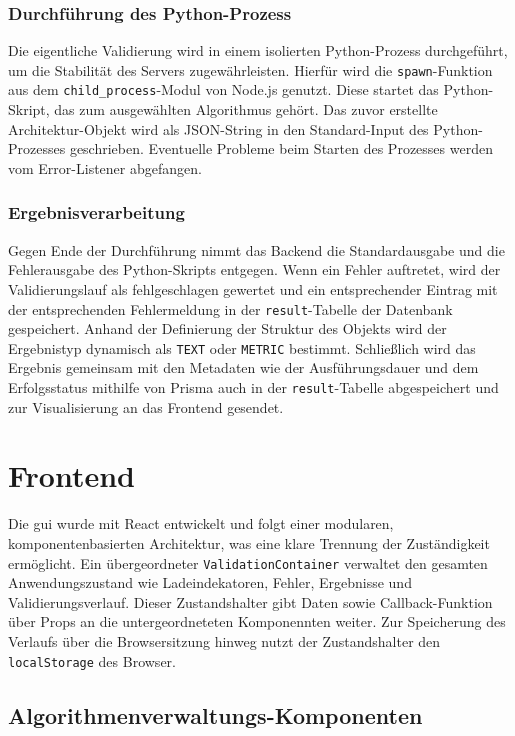 \subsubsection*{Durchführung des Python-Prozess}

Die eigentliche Validierung wird in einem isolierten Python-Prozess durchgeführt, um die Stabilität des Servers zugewährleisten. Hierfür wird die \texttt{spawn}-Funktion aus dem \texttt{child\_process}-Modul von Node.js genutzt. Diese startet das Python-Skript, das zum ausgewählten Algorithmus gehört. Das zuvor erstellte Architektur-Objekt wird als JSON-String in den Standard-Input des Python-Prozesses geschrieben. Eventuelle Probleme beim Starten des Prozesses werden vom Error-Listener abgefangen.

\subsubsection*{Ergebnisverarbeitung}

Gegen Ende der Durchführung nimmt das Backend die Standardausgabe und die Fehlerausgabe des Python-Skripts entgegen. Wenn ein Fehler auftretet, wird der Validierungslauf als fehlgeschlagen gewertet und ein entsprechender Eintrag mit der entsprechenden Fehlermeldung in der \texttt{result}-Tabelle der Datenbank gespeichert. Anhand der Definierung der Struktur des Objekts wird der Ergebnistyp dynamisch als \texttt{TEXT} oder \texttt{METRIC} bestimmt. Schließlich wird das Ergebnis gemeinsam mit den Metadaten wie der Ausführungsdauer und dem Erfolgsstatus mithilfe von Prisma auch in der \texttt{result}-Tabelle abgespeichert und zur Visualisierung an das Frontend gesendet.

\section{Frontend}
\label{sec:frontendimp}

Die \gls{gui} wurde mit React entwickelt und folgt einer modularen, komponentenbasierten Architektur, was eine klare Trennung der Zuständigkeit ermöglicht. Ein übergeordneter \texttt{ValidationContainer} verwaltet den gesamten Anwendungszustand wie Ladeindekatoren, Fehler, Ergebnisse und Validierungsverlauf. Dieser Zustandshalter gibt Daten sowie Callback-Funktion über Props an  die untergeordneteten Komponennten weiter. Zur Speicherung des Verlaufs über die Browsersitzung hinweg nutzt der Zustandshalter den \texttt{localStorage} des Browser.

\subsection{Algorithmenverwaltungs-Komponenten}
\label{subsec:verwaltung}

